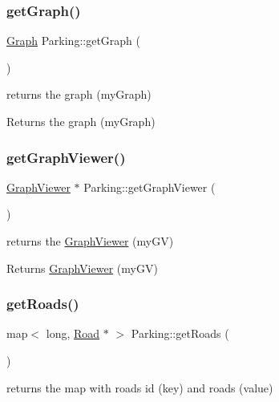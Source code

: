 \subsubsection{\texorpdfstring{get\+Graph()}{getGraph()}}
{\footnotesize\ttfamily \hyperlink{class_graph}{Graph} Parking\+::get\+Graph (\begin{DoxyParamCaption}{ }\end{DoxyParamCaption})}



returns the graph (my\+Graph) 

\begin{DoxyReturn}{Returns}
the graph (my\+Graph) 
\end{DoxyReturn}
\hypertarget{class_parking_aa4e46408596998c56555a55010efa8c5}{}\label{class_parking_aa4e46408596998c56555a55010efa8c5} 
\subsubsection{\texorpdfstring{get\+Graph\+Viewer()}{getGraphViewer()}}
{\footnotesize\ttfamily \hyperlink{class_graph_viewer}{Graph\+Viewer} $\ast$ Parking\+::get\+Graph\+Viewer (\begin{DoxyParamCaption}{ }\end{DoxyParamCaption})}



returns the \hyperlink{class_graph_viewer}{Graph\+Viewer} (my\+GV) 

\begin{DoxyReturn}{Returns}
\hyperlink{class_graph_viewer}{Graph\+Viewer} (my\+GV) 
\end{DoxyReturn}
\hypertarget{class_parking_a9417cfc4ef7b657a9f8669ac99ba52dc}{}\label{class_parking_a9417cfc4ef7b657a9f8669ac99ba52dc} 
\subsubsection{\texorpdfstring{get\+Roads()}{getRoads()}}
{\footnotesize\ttfamily map$<$ long, \hyperlink{class_road}{Road} $\ast$ $>$ Parking\+::get\+Roads (\begin{DoxyParamCaption}{ }\end{DoxyParamCaption})}



returns the map with roads id (key) and roads (value) 

